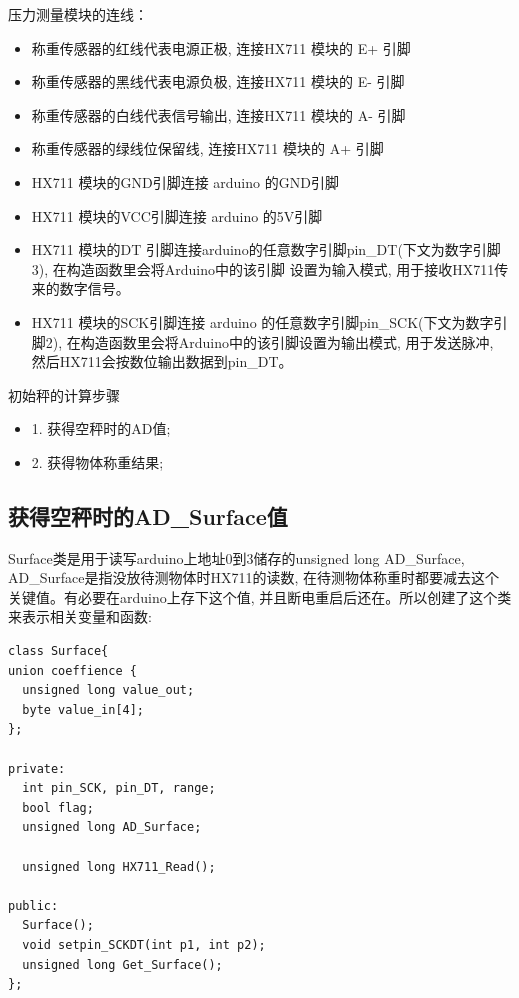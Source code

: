 \documentclass{article}
\begin{document}
	压力测量模块的连线：
\begin{itemize}
	\item 称重传感器的红线代表电源正极, 连接HX711 模块的 E+ 引脚
	\item 称重传感器的黑线代表电源负极, 连接HX711 模块的 E- \hspace{0.5em}引脚
	\item 称重传感器的白线代表信号输出, 连接HX711 模块的 A- \hspace{0.5em}引脚
	\item 称重传感器的绿线位保留线, 连接HX711 模块的 A+ 引脚		
	\item HX711 模块的GND引脚连接 arduino 的GND引脚
	\item HX711 模块的VCC引脚连接 arduino 的5V引脚
	\item HX711 模块的DT\hspace{0.5em} 引脚连接arduino的任意数字引脚pin\_DT(下文为数字引脚3), 在构造函数里会将Arduino中的该引脚
	设置为输入模式, 用于接收HX711传来的数字信号。
	\item HX711 模块的SCK引脚连接 arduino 的任意数字引脚pin\_SCK(下文为数字引脚2), 在构造函数里会将Arduino中的该引脚设置为输出模式,
	用于发送脉冲, 然后HX711会按数位输出数据到pin\_DT。
\end{itemize}

初始秤的计算步骤
\begin{itemize}
  \item 1. 获得空秤时的AD值;
  \item 2. 获得物体称重结果;
\end{itemize}

\subsection{获得空秤时的AD\_Surface值}
Surface类是用于读写arduino上地址0到3储存的unsigned long AD\_Surface, AD\_Surface是指没放待测物体时HX711的读数,
在待测物体称重时都要减去这个关键值。有必要在arduino上存下这个值, 并且断电重启后还在。所以创建了这个类来表示相关变量和函数:

\begin{lstlisting}
class Surface{
union coeffience {
  unsigned long value_out;
  byte value_in[4];
};

private:
  int pin_SCK, pin_DT, range; 
  bool flag;
  unsigned long AD_Surface;

  unsigned long HX711_Read();

public:
  Surface();
  void setpin_SCKDT(int p1, int p2);
  unsigned long Get_Surface();
};
\end{lstlisting}
\end{document}
